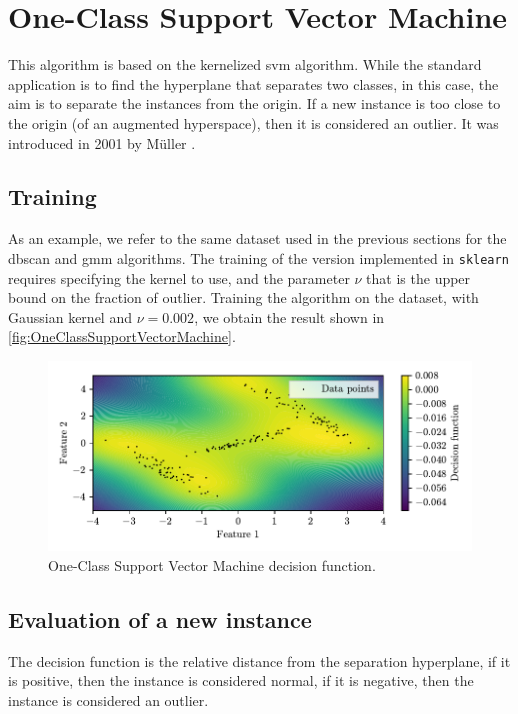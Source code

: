\section{One-Class Support Vector Machine}
\label{sec:OneClassSupportVectorMachine}

This algorithm is based on the kernelized \gls{svm} algorithm. While the standard application is to find the hyperplane that separates two classes, in this case, the aim is to separate the instances from the origin. If a new instance is too close to the origin (of an augmented hyperspace), then it is considered an outlier. It was introduced in 2001 by M\"{u}ller \cite{mullerOneClassSVM}.

\subsection{Training}
As an example, we refer to the same dataset used in the previous sections for the \gls{dbscan} and {\gls{gmm}} algorithms. The training of the version implemented in \texttt{sklearn} requires specifying the kernel to use, and the parameter $\nu$ that is the upper bound on the fraction of outlier. Training the algorithm on the dataset, with Gaussian kernel and $\nu=0.002$, we obtain the result shown in \autoref{fig:OneClassSupportVectorMachine}. 

\begin{figure}
    \centering
    \includegraphics{images/nuSVM/Figure_1.pdf}
    \caption{One-Class Support Vector Machine decision function.}
    \label{fig:OneClassSupportVectorMachine}
\end{figure}

\subsection{Evaluation of a new instance}
\label{sec:svm_eval}
The decision function is the relative distance from the separation hyperplane, if it is positive, then the instance is considered normal, if it is negative, then the instance is considered an outlier. 

